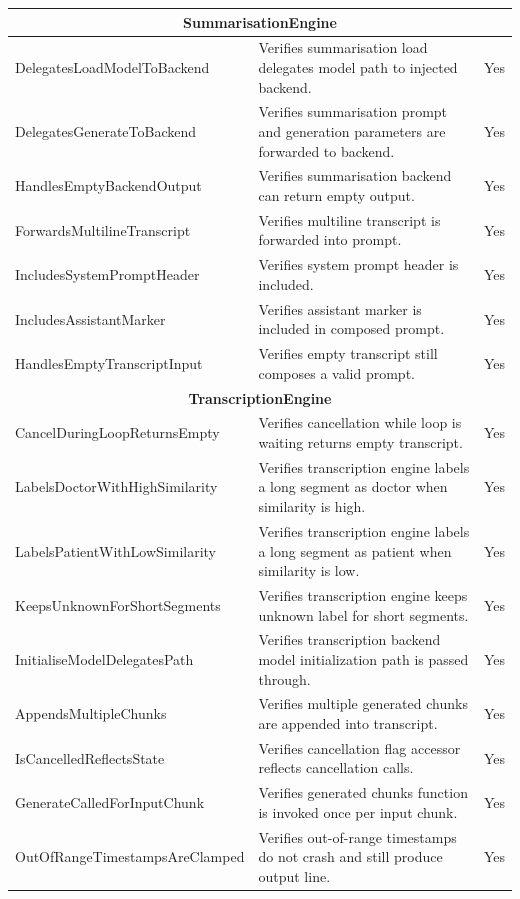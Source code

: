 \begin{longtable}{|p{}|p{}|c|}
\hline
\multicolumn{3}{|c|}{\textbf{SummarisationEngine}} \\
\hline
DelegatesLoadModelToBackend & Verifies summarisation load delegates model path to injected backend. & Yes \\ \hline
DelegatesGenerateToBackend & Verifies summarisation prompt and generation parameters are forwarded to backend. & Yes \\ \hline
HandlesEmptyBackendOutput & Verifies summarisation backend can return empty output. & Yes \\ \hline
ForwardsMultilineTranscript & Verifies multiline transcript is forwarded into prompt. & Yes \\ \hline
IncludesSystemPromptHeader & Verifies system prompt header is included. & Yes \\ \hline
IncludesAssistantMarker & Verifies assistant marker is included in composed prompt. & Yes \\ \hline
HandlesEmptyTranscriptInput & Verifies empty transcript still composes a valid prompt. & Yes \\ \hline

\hline
\multicolumn{3}{|c|}{\textbf{TranscriptionEngine}} \\
\hline
CancelDuringLoopReturnsEmpty & Verifies cancellation while loop is waiting returns empty transcript. & Yes \\ \hline
LabelsDoctorWithHighSimilarity & Verifies transcription engine labels a long segment as doctor when similarity is high. & Yes \\ \hline
LabelsPatientWithLowSimilarity & Verifies transcription engine labels a long segment as patient when similarity is low. & Yes \\ \hline
KeepsUnknownForShortSegments & Verifies transcription engine keeps unknown label for short segments. & Yes \\ \hline
InitialiseModelDelegatesPath & Verifies transcription backend model initialization path is passed through. & Yes \\ \hline
AppendsMultipleChunks & Verifies multiple generated chunks are appended into transcript. & Yes \\ \hline
IsCancelledReflectsState & Verifies cancellation flag accessor reflects cancellation calls. & Yes \\ \hline
GenerateCalledForInputChunk & Verifies generated chunks function is invoked once per input chunk. & Yes \\ \hline
OutOfRangeTimestampsAreClamped & Verifies out-of-range timestamps do not crash and still produce output line. & Yes \\ \hline
\end{longtable}
\endgroup